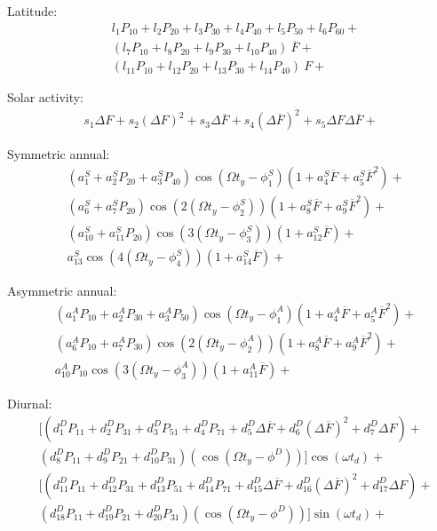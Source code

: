 \documentclass[referee,a4paper,12pt,traditabstract]{swsc}
\begin{document}
\begin{linenumbers}
Latitude:
\begin{align*}
& l_1 P_{10} + l_2 P_{20} + l_3 P_{30} + l_4 P_{40} + l_5 P_{50} + l_6 P_{60} + \\
& (l_7 P_{10} + l_8 P_{20} + l_9 P_{30} + l_{10} P_{40})~\overline{F} + \\
& (l_{11} P_{10} + l_{12} P_{20} + l_{13} P_{30} + l_{14} P_{40})~F +
\end{align*}

Solar activity:
\begin{align*}
s_1 \Delta F + s_2 (\Delta F)^2 + s_3 \Delta \overline{F} + s_4 (\Delta \overline{F})^2 + s_5 \Delta F \Delta \overline{F} +
\end{align*}

Symmetric annual:
\begin{align*}
&(a^S_1 + a^S_2 P_{20} + a^S_3P_{40})\cos(\Omega t_y-\phi^S_1)(1+a^S_4\overline{F}+ a^S_5\overline{F}^2) +\\
&(a^S_6 + a^S_7 P_{20})\cos(2(\Omega t_y-\phi^S_2))(1+a^S_8\overline{F}+ a^S_9\overline{F}^2) +\\
&(a^S_{10} + a^S_{11} P_{20})\cos(3(\Omega t_y-\phi^S_3))(1+a^S_{12}\overline{F})+\\
&a^S_{13}\cos(4(\Omega t_y-\phi^S_4))(1+a^S_{14}\overline{F})+
\end{align*}

Asymmetric annual:
\begin{align*}
&(a^A_1P_{10}+a^A_2P_{30}+a^A_3 P_{50})\cos(\Omega t_y-\phi^A_1)(1+a^A_4\overline{F}+a^A_5\overline{F}^2)+\\
&(a^A_6P_{10}+a^A_7P_{30})\cos(2(\Omega t_y-\phi^A_2))(1+a^A_8\overline{F}+a^A_9\overline{F}^2) + \\
&a^A_{10} P_{10}\cos(3(\Omega t_y-\phi^A_3))(1+a^A_{11}\overline{F})+
\end{align*}

Diurnal:
\begin{align*}
&[(d^D_1 P_{11}+d^D_2 P_{31}+d^D_3 P_{51}+d^D_4 P_{71} + d^D_5\Delta\overline{F} + d^D_6(\Delta\overline{F})^2 + d^D_7 \Delta F) + \\
&(d^D_8 P_{11} + d^D_9 P_{21} + d^D_{10} P_{31})(\cos(\Omega t_y-\phi^D))]\cos(\omega t_d)+\\
&[(d^D_{11} P_{11}+d^D_{12} P_{31}+d^D_{13} P_{51}+d^D_{14} P_{71} + d^D_{15}\Delta\overline{F} + d^D_{16}(\Delta\overline{F})^2 + d^D_{17} \Delta F) + \\
&(d^D_{18} P_{11} + d^D_{19} P_{21} + d^D_{20} P_{31})(\cos(\Omega t_y-\phi^D))]\sin(\omega t_d)+
\end{align*}


\end{linenumbers}
\end{document}
